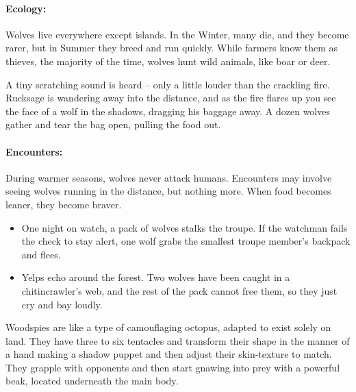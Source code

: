 \begin{multicols}{2}
\stirgeSwarm

\label{wolf}

\paragraph{Ecology:} Wolves live everywhere except islands.  In the Winter, many die, and they become rarer, but in Summer they breed and run quickly.  While farmers know them as thieves, the majority of the time, wolves hunt wild animals, like boar or deer.

\begin{boxtext}

  A tiny scratching sound is heard -- only a little louder than the crackling fire.
  Rucksage is wandering away into the distance, and as the fire flares up you see the face of a wolf in the shadows, dragging his baggage away.
  A dozen wolves gather and tear the bag open, pulling the food out.

\end{boxtext}


\paragraph{Encounters:} During warmer seasons, wolves never attack humans.
Encounters may involve seeing wolves running in the distance, but nothing more.
When food becomes leaner, they become braver.

\begin{itemize}

  \item
  One night on watch, a pack of wolves stalks the troupe.
  If the watchman fails the  check to stay alert, one wolf grabs the smallest troupe member's backpack and flees.
  \item
  Yelps echo around the forest.
  Two wolves have been caught in a chitincrawler's web, and the rest of the pack cannot free them, so they just cry and bay loudly.
\end{itemize}

\label{woodspy}

Woodspies are like a type of camouflaging octopus, adapted to exist solely on land.  They have three to six tentacles and transform their shape in the manner of a hand making a shadow puppet and then adjust their skin-texture to match.  They grapple with opponents and then start gnawing into prey with a powerful beak, located underneath the main body.


\end{multicols}
